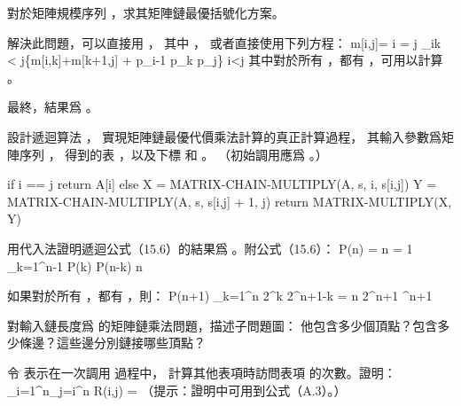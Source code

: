\startsection[
  title={Matrix-chain multiplication},
  reference=section:15.2,
]

\startEXERCISE
對於矩陣規模序列 ，求其矩陣鏈最優括號化方案。
\stopEXERCISE

\startANSWER
解決此問題，可以直接用 ，
其中 ，
或者直接使用下列方程：
\startformula
m[i,j]=\startmathcases
{} \MC {} i = j\NR
\NC \min_{i\le k < j}\{m[i,k]+m[k+1,j] + p_{i-1} p_k p_j\}\MC {} i<j\NR
\stopmathcases
\stopformula
其中對於所有 ，都有 ，可用以計算 。

\externalfigure[output/e15_2_1-1]
\externalfigure[output/e15_2_1-2]

最終，結果爲 。
\stopANSWER

\startEXERCISE
設計遞迴算法 ，
實現矩陣鏈最優代價乘法計算的真正計算過程，
其輸入參數爲矩陣序列 ，
  得到的表 ，以及下標  和 。
（初始調用應爲 。）
\stopEXERCISE

\startANSWER
{}
\startCLRS
if i == j
	return A[i]
else
	X = MATRIX-CHAIN-MULTIPLY(A, s, i, s[i,j])
	Y = MATRIX-CHAIN-MULTIPLY(A, s, s[i,j] + 1, j)
	return MATRIX-MULTIPLY(X, Y)
\stopCLRS
\stopANSWER

\startEXERCISE
用代入法證明遞迴公式（15.6）的結果爲 。附公式（15.6）：
\startformula
P(n) = \startmathcases
{} \MC {} n = 1 \NR
\NC \sum_{k=1}^{n-1} P(k) P(n-k) \MC {} n \NR
\stopmathcases
\stopformula
\stopEXERCISE

\startANSWER
如果對於所有 ，都有 ，則：
\startformula
P(n+1) \ge \sum_{k=1}^{n} 2^k 2^{n+1-k} = n 2^{n+1} ^{n+1}
\stopformula
\stopANSWER

\startEXERCISE
對輸入鏈長度爲  的矩陣鏈乘法問題，描述子問題圖：
他包含多少個頂點？包含多少條邊？這些邊分別鏈接哪些頂點？
\stopEXERCISE

\startANSWER
\TODO{}
\stopANSWER

\startEXERCISE
令  表示在一次調用  過程中，
計算其他表項時訪問表項  的次數。證明：
\startformula
\sum_{i=1}^n\sum_{j=i}^{n} R(i,j) = 
\stopformula
（{\EMP 提示：}證明中可用到公式（A.3）。）
\stopEXERCISE

